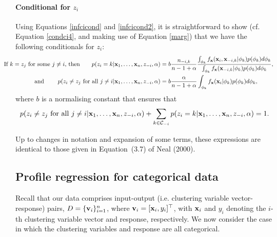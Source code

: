 \documentclass[12pt]{article}
\begin{document}
 \paragraph{Conditional for $z_i$}
Using Equations \eqref{infcicond} and \eqref{infcicond2}, it is straightforward to show (cf. Equation \eqref{condci4}, and making use of Equation \eqref{marg}) that we have the following conditionals for $z_i$:
\begin{align}
\hspace{-0.7cm}\mbox{If $k = z_j$ for some $j \ne i$, then\qquad} p(z_i=k|{\bf x}_1,\ldots, {\bf x}_n,z_{-i}, \alpha) &= b\frac{n_{-i,k}}{n - 1 + \alpha} \frac{\int_{\phi_k}f_{\bf x}({\bf x}_i,{\bf x}_{-i,k}|\phi_k) p(\phi_k)d\phi_k}{\int_{\phi_k}f_{\bf x}({\bf x}_{-i,k}|\phi_k) p(\phi_k)d\phi_k}, \label{infcond1}\\
\mbox{and \qquad} p(z_i \ne z_j \mbox{ for all } j \ne i| {\bf x}_1,\ldots, {\bf x}_n, z_{-i}, \alpha) &= b\frac{\alpha}{n - 1 + \alpha} \int_{\phi_k}f_{\bf x}({\bf x}_i | \phi_k) p(\phi_k) d\phi_k,\label{infcond2}
\end{align}
where $b$ is a normalising constant that ensures that
\begin{equation}
p(z_i \ne z_j \mbox{ for all } j \ne i| {\bf x}_1,\ldots, {\bf x}_n, z_{-i}, \alpha) + \sum_{k \in \mathcal{C}_{-i}} p(z_i=k|{\bf x}_1,\ldots, {\bf x}_n,z_{-i}, \alpha) = 1. \notag
\end{equation}

Up to changes in notation and expansion of some terms, these expressions are identical to those given in Equation~(3.7) of Neal (2000).

\subsection{Profile regression for categorical data}\label{profileRegression}
Recall that our data comprises input-output (i.e. clustering variable vector-response) pairs, $D = \{{\bf v}_i \}_{i = 1}^n$, where ${\bf v}_i = [{\bf x}_i, y_i]^\top$, with ${\bf x}_i$  and $y_i$ denoting the $i$-th clustering variable vector and response, respectively.  We now consider the case in which the clustering variables and response are all categorical.  
\end{document}

